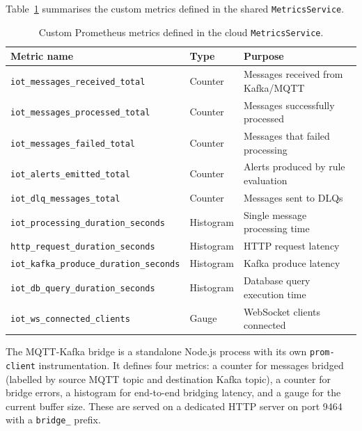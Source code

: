 Table~\ref{tab:cloud-custom-metrics} summarises the custom metrics defined in the shared \texttt{MetricsService}.

\begin{table}[htbp]
    \centering
    \caption{Custom Prometheus metrics defined in the cloud \texttt{MetricsService}.}
    \label{tab:cloud-custom-metrics}
    \small
    \begin{tabular}{l l p{6cm}}
        \hline
        \textbf{Metric name}                            & \textbf{Type} & \textbf{Purpose}                        \\
        \hline
        \texttt{iot\_messages\_received\_total}         & Counter       & Messages received from Kafka/\gls{MQTT} \\
        \texttt{iot\_messages\_processed\_total}        & Counter       & Messages successfully processed         \\
        \texttt{iot\_messages\_failed\_total}           & Counter       & Messages that failed processing         \\
        \texttt{iot\_alerts\_emitted\_total}            & Counter       & Alerts produced by rule evaluation      \\
        \texttt{iot\_dlq\_messages\_total}              & Counter       & Messages sent to \glspl{DLQ}            \\
        \texttt{iot\_processing\_duration\_seconds}     & Histogram     & Single message processing time          \\
        \texttt{http\_request\_duration\_seconds}       & Histogram     & \gls{HTTP} request latency              \\
        \texttt{iot\_kafka\_produce\_duration\_seconds} & Histogram     & Kafka produce latency                   \\
        \texttt{iot\_db\_query\_duration\_seconds}      & Histogram     & Database query execution time           \\
        \texttt{iot\_ws\_connected\_clients}            & Gauge         & WebSocket clients connected             \\
        \hline
    \end{tabular}
\end{table}

The \gls{MQTT}-Kafka bridge is a standalone Node.js process with its own \texttt{prom-client} instrumentation. It defines four metrics: a counter for messages bridged (labelled by source \gls{MQTT} topic and destination Kafka topic), a counter for bridge errors, a histogram for end-to-end bridging latency, and a gauge for the current buffer size. These are served on a dedicated \gls{HTTP} server on port 9464 with a \texttt{bridge\_} prefix.

